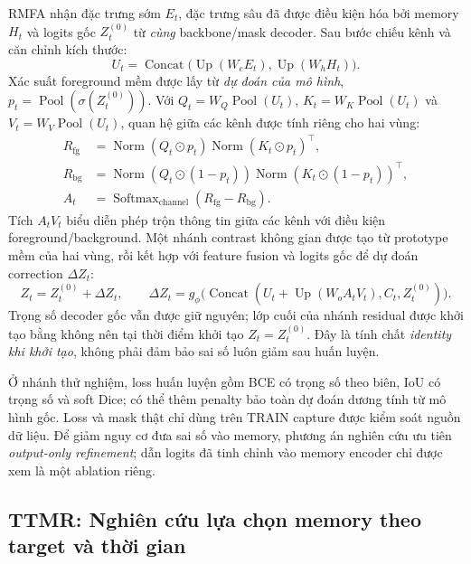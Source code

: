 RMFA nhận đặc trưng sớm $E_t$, đặc trưng sâu đã được điều kiện hóa
bởi memory $H_t$ và logits gốc $Z_t^{(0)}$ từ \emph{cùng}
backbone/mask decoder. Sau bước chiếu kênh và căn chỉnh kích thước:
\begin{equation}
U_t = \operatorname{Concat}
\big(\operatorname{Up}(W_e E_t),
     \operatorname{Up}(W_h H_t)\big).
\label{eq:adeseg-rmfa-project}
\end{equation}
Xác suất foreground mềm được lấy từ \emph{dự đoán của mô hình},
$p_t=\operatorname{Pool}(\sigma(Z_t^{(0)}))$.
Với $Q_t=W_Q\operatorname{Pool}(U_t)$,
$K_t=W_K\operatorname{Pool}(U_t)$ và
$V_t=W_V\operatorname{Pool}(U_t)$, quan hệ giữa các kênh được
tính riêng cho hai vùng:
\begin{align}
R_{\mathrm{fg}} &=
  \operatorname{Norm}(Q_t\odot p_t)
  \operatorname{Norm}(K_t\odot p_t)^{\top},\\
R_{\mathrm{bg}} &=
  \operatorname{Norm}(Q_t\odot (1-p_t))
  \operatorname{Norm}(K_t\odot (1-p_t))^{\top},\\
A_t &= \operatorname{Softmax}_{\mathrm{channel}}
  (R_{\mathrm{fg}}-R_{\mathrm{bg}}).
\label{eq:adeseg-rmfa-channel}
\end{align}
Tích $A_tV_t$ biểu diễn phép trộn thông tin giữa các kênh
với điều kiện foreground/background. Một nhánh contrast không gian
được tạo từ prototype mềm của hai vùng, rồi kết hợp với feature
fusion và logits gốc để dự đoán correction $\Delta Z_t$:
\begin{equation}
Z_t=Z_t^{(0)}+\Delta Z_t,\qquad
\Delta Z_t =
g_{\phi}\big(
 \operatorname{Concat}(
 U_t+\operatorname{Up}(W_o A_tV_t),
 C_t,Z_t^{(0)})
\big).
\label{eq:adeseg-rmfa-residual}
\end{equation}
Trọng số decoder gốc vẫn được giữ nguyên; lớp cuối của nhánh
residual được khởi tạo bằng không nên tại thời điểm khởi tạo
$Z_t=Z_t^{(0)}$. Đây là tính chất \emph{identity khi khởi tạo},
không phải đảm bảo sai số luôn giảm sau huấn luyện.

Ở nhánh thử nghiệm, loss huấn luyện gồm BCE có trọng số theo biên,
IoU có trọng số và soft Dice; có thể thêm penalty bảo toàn
dự đoán dương tính từ mô hình gốc. Loss và mask thật chỉ dùng
trên TRAIN capture được kiểm soát nguồn dữ liệu. Để giảm nguy cơ
đưa sai số vào memory, phương án nghiên cứu ưu tiên
\textit{output-only refinement}; dẫn logits đã tinh chỉnh vào
memory encoder chỉ được xem là một ablation riêng.

\subsection{TTMR: Nghiên cứu lựa chọn memory theo target và thời gian}
\label{subsec:adeseg-ttmr}

